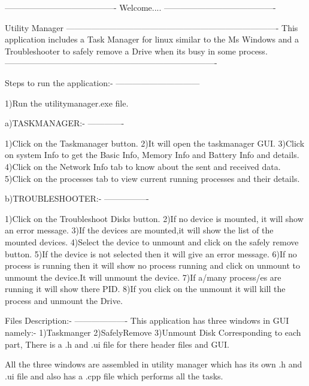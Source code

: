 ----------------------------------------
Welcome....
----------------------------------------

Utility Manager
----------------------------------------------------------------------------
This application includes a Task Manager for linux similar to the Ms Windows
and a Troubleshooter to safely remove a Drive when its busy in some process.
----------------------------------------------------------------------------

Steps to run the application:-
------------------------------


1)Run the utilitymanager.exe file.

a)TASKMANAGER:-
  -------------

1)Click on the Taskmanager button.
2)It will open the taskmanager GUI.
3)Click  on system Info  to get the Basic Info, Memory Info and Battery Info and details.
4)Click on the Network Info tab to know about the sent and received data.
5)Click on the processes tab to view current running processes and their details.

b)TROUBLESHOOTER:-
  ----------------

1)Click on the Troubleshoot Disks button.
2)If no device is mounted, it will show an error message.
3)If the devices are mounted,it will show the list of the mounted devices.
4)Select the device to unmount and click on the safely remove button.
5)If the device is not selected then it will give an error message.
6)If no process is running then it will show no process running and
  click on unmount to unmount the device.It will unmount the device.
7)If a/many process/es are running it will show there PID.
8)If you click on the unmount it will kill the process and unmount the Drive.

Files Description:-
-------------------
This application has three windows in GUI namely:-
1)Taskmanger
2)SafelyRemove
3)Unmount Disk
Corresponding to each part, There is a .h and .ui file for there header files and GUI.

All the three windows are assembled in utility manager which has its own .h and .ui file and also has a .cpp file which performs all the tasks.

